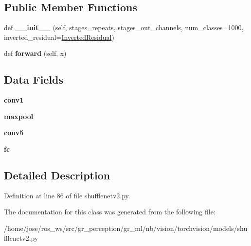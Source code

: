 \subsection*{Public Member Functions}
\begin{DoxyCompactItemize}
\item 
\mbox{\label{classtorchvision_1_1models_1_1shufflenetv2_1_1ShuffleNetV2_aa5a58bc71a8023b881590a7bfed64a93}} 
def {\bfseries \+\_\+\+\_\+init\+\_\+\+\_\+} (self, stages\+\_\+repeats, stages\+\_\+out\+\_\+channels, num\+\_\+classes=1000, inverted\+\_\+residual=\hyperlink{classtorchvision_1_1models_1_1shufflenetv2_1_1InvertedResidual}{Inverted\+Residual})
\item 
\mbox{\label{classtorchvision_1_1models_1_1shufflenetv2_1_1ShuffleNetV2_a1de22df0e5e91d2ea2b6b7f1842f25d1}} 
def {\bfseries forward} (self, x)
\end{DoxyCompactItemize}
\subsection*{Data Fields}
\begin{DoxyCompactItemize}
\item 
\mbox{\label{classtorchvision_1_1models_1_1shufflenetv2_1_1ShuffleNetV2_ac3059a5f3883737fdbf4cc489a81b458}} 
{\bfseries conv1}
\item 
\mbox{\label{classtorchvision_1_1models_1_1shufflenetv2_1_1ShuffleNetV2_ae38fa1a6a81450934cfd08ebebbde36c}} 
{\bfseries maxpool}
\item 
\mbox{\label{classtorchvision_1_1models_1_1shufflenetv2_1_1ShuffleNetV2_acd9a8b293ecb60f3a6a88b10e3c9938a}} 
{\bfseries conv5}
\item 
\mbox{\label{classtorchvision_1_1models_1_1shufflenetv2_1_1ShuffleNetV2_a4bad18d9c9a36e67b0001281866058e9}} 
{\bfseries fc}
\end{DoxyCompactItemize}


\subsection{Detailed Description}


Definition at line 86 of file shufflenetv2.\+py.



The documentation for this class was generated from the following file\+:\begin{DoxyCompactItemize}
\item 
/home/jose/ros\+\_\+ws/src/gr\+\_\+perception/gr\+\_\+ml/nb/vision/torchvision/models/shufflenetv2.\+py\end{DoxyCompactItemize}
